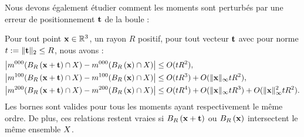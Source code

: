 Nous devons également étudier comment les moments sont perturbés par une erreur de positionnement $\mathbf{t}$ de la boule :
%
\begin{lemma} \label{lem:moments-ball-position-error}
%
  Pour tout point $\mathbf{x} \in \mathbb{R}^3$, un rayon $R$
  positif, pour tout vecteur $\mathbf{t}$ avec pour norme $t := \| \mathbf{t} \|_2 \le R$,
  nous avons :
%
  \begin{align}
    \left| m^{000}(B_{R}\left(\mathbf{x} + \mathbf{t}\right) \cap X) - m^{000}(B_{R}\left(\mathbf{x}\right) \cap X) \right|
    & \le O(t R^2), \label{eq:zero-moments-ball-position-error} \\
    \left| m^{100}(B_{R}\left(\mathbf{x} + \mathbf{t}\right) \cap X) - m^{100}(B_{R}\left(\mathbf{x}\right) \cap X) \right|
    & \le O(t R^3) + O( \|\mathbf{x}\|_\infty t R^2 ), \label{eq:first-moments-ball-position-error}\\
    \left| m^{200}(B_{R}\left(\mathbf{x} + \mathbf{t}\right) \cap X) - m^{200}(B_{R}\left(\mathbf{x}\right) \cap X) \right|
    & \le O(t R^4) + O( \|\mathbf{x}\|_\infty t R^3 ) + O( \|\mathbf{x}\|^2_\infty t R^2 ). \label{eq:second-moments-ball-position-error}
  \end{align}
%
  Les bornes sont valides pour tous les moments ayant respectivement le même
  ordre. De plus, ces relations restent vraies si $B_{R}\left(\mathbf{x}+\mathbf{t}\right)$ ou
  $B_{R}\left(\mathbf{x}\right)$ intersectent le même ensemble $X$.
%
\end{lemma}
